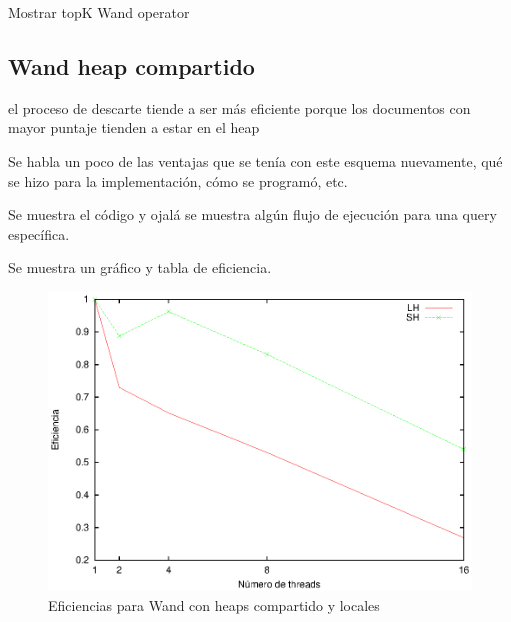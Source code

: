   







Mostrar topK Wand operator



\subsection{Wand heap compartido}
\label{evaluacionexperimental:whc}

 el proceso de descarte tiende a ser más eficiente porque los documentos con mayor puntaje tienden a estar en el heap

Se habla un poco de las ventajas que se tenía con este esquema nuevamente, qué se hizo para la implementación, cómo se programó, etc. 

Se muestra el código y ojalá se muestra algún flujo de ejecución para una query específica.

%

Se muestra un gráfico y tabla de eficiencia.


\begin{figure}[!ht]
\centering
\includegraphics[scale=.75]{images/eficiencias_wand.eps}
\caption{Eficiencias para Wand con heaps compartido y locales}
\label{fig:eficiencias_wand}
\end{figure}


